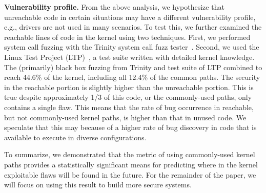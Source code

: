 \textbf{Vulnerability profile.} 
From the above analysis, we hypothesize that unreachable code in certain 
situations may have a different vulnerability profile, e.g., drivers are not used
in many scenarios.  To test this, we
further examined the reachable lines of
code in the kernel using two techniques. First,
we performed system call fuzzing with the Trinity
system call fuzz tester~\cite{Trinity}. 
Second, we used the Linux Test Project (LTP)~\cite{LTP}, a test suite written
with detailed kernel knowledge. 
%
The (primarily) black box fuzzing from Trinity and test suite of
LTP combined to reach 44.6\% of the kernel, including all 12.4\% of the common
paths.  The security in the reachable portion is 
slightly higher than the unreachable portion. This is true despite
approximately 1/3 of this code, or the commonly-used paths, only contains
a single flaw. This means that the rate of bug occurrence in reachable, but
not commonly-used kernel paths, is higher than that in unused
code. We speculate that this may because of a higher rate of bug discovery
in code that is available to execute in diverse configurations.

To summarize, we demonstrated that the metric of using commonly-used
kernel paths provides a statistically significant 
means for predicting where in the kernel exploitable flaws
will be found in the future.  For the remainder of the paper, we will
focus on using this result to build more secure systems.

